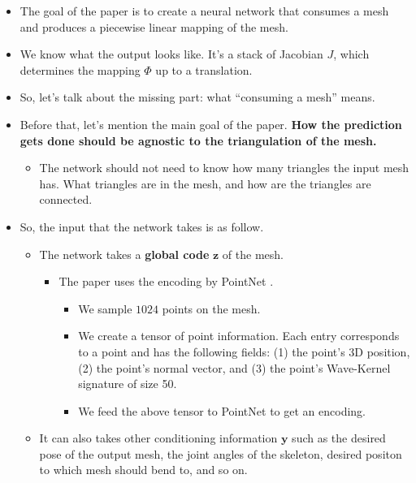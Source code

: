 \documentclass[10pt]{article}
\newcommand{\ve}[1]{\mathbf{#1}}
\begin{document}
\begin{itemize}
    \item The goal of the paper is to create a neural network that consumes a mesh and produces a piecewise linear mapping of the mesh.
    
    \item We know what the output looks like. It's a stack of Jacobian $J$, which determines the mapping $\Phi$ up to a translation.
    
    \item So, let's talk about the missing part: what ``consuming a mesh'' means.
    
    \item Before that, let's mention the main goal of the paper. {\bf How the prediction gets done should be agnostic to the triangulation of the mesh.}
    \begin{itemize}
        \item The network should not need to know how many triangles the input mesh has. What triangles are in the mesh, and how are the triangles are connected.
    \end{itemize}

    \item So, the input that the network takes is as follow.
    \begin{itemize}
        \item The network takes a {\bf global code} $\ve{z}$ of the mesh. 
        \begin{itemize}
            \item The paper uses the encoding by PointNet \cite{Qi:PointNet:2017}.
            \begin{itemize}
                \item We sample $1024$ points on the mesh.
                \item We create a tensor of point information. Each entry corresponds to a point and has the following fields: (1) the point's 3D position, (2) the point's normal vector, and (3) the point's Wave-Kernel signature \cite{Aubry:WKS:2011} of size 50.
                \item We feed the above tensor to PointNet to get an encoding.            
            \end{itemize}                    
        \end{itemize}

        \item It can also takes other conditioning information $\ve{y}$ such as the desired pose of the output mesh, the joint angles of the skeleton, desired positon to which mesh should bend to, and so on.
        

\end{itemize}
\end{itemize}
\end{document}
